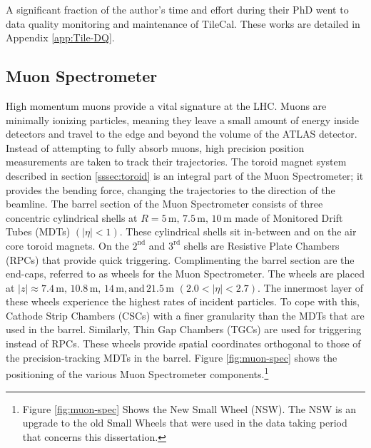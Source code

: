 		A significant fraction of the author's time and effort during their PhD went to data quality monitoring and maintenance of TileCal. These works are detailed in Appendix \ref{app:Tile-DQ}.

	\subsection{Muon Spectrometer}\label{ssec:muon-system}
	High momentum muons provide a vital signature at the LHC. Muons are minimally ionizing particles, meaning they leave a small amount of energy inside detectors and travel to the edge and beyond the volume of the ATLAS detector. Instead of attempting to fully absorb muons, high precision position measurements are taken to track their trajectories. The toroid magnet system described in section \ref{sssec:toroid} is an integral part of the Muon Spectrometer; it provides the bending force, changing the trajectories to the direction of the beamline. The barrel section of the Muon Spectrometer consists of three concentric cylindrical shells at $R=5 \, \mathrm{ m, }\, 7.5 \, \mathrm{ m, } \,  10 \, \mathrm{ m}$ made of Monitored Drift Tubes (MDTs) $(|\eta|<1)$. \cite{ATLAS-muon} These cylindrical shells sit in-between and on the air core toroid magnets. On the $2^{\mathrm{nd}}$ and $3^{\mathrm{rd}}$ shells are Resistive Plate Chambers (RPCs) that provide quick triggering. Complimenting the barrel section are the end-caps, referred to as wheels for the Muon Spectrometer. The wheels are placed at $|z|\approx 7.4 \, \mathrm{ m, } \, 10.8 \, \mathrm{ m, } \, 14 \, \mathrm{ m, and} \,21.5 \,\mathrm{ m }$ $(2.0 < |\eta| < 2.7)$. The innermost layer of these wheels experience the highest rates of incident particles. To cope with this, Cathode Strip Chambers (CSCs) with a finer granularity than the MDTs that are used in the barrel. Similarly, Thin Gap Chambers (TGCs) are used for triggering instead of RPCs. These wheels provide spatial coordinates orthogonal to those of the precision-tracking MDTs in the barrel. Figure \ref{fig:muon-spec} shows the positioning of the various Muon Spectrometer components.\footnote{Figure \ref{fig:muon-spec} Shows the New Small Wheel (NSW). The NSW is an upgrade to the old Small Wheels that were used in the data taking period that concerns this dissertation.}



